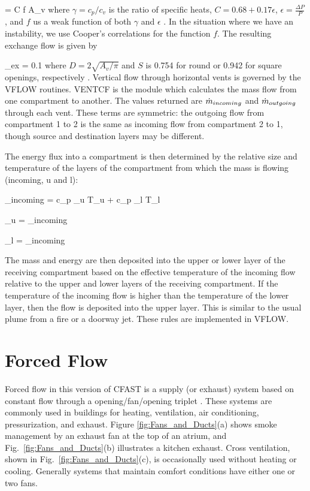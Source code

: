 \be \dm = C f\brackets{\gamma, \epsilon}  A_v \ee
where $\gamma = c_p/c_v$ is the ratio of specific heats, $C = 0.68 + 0.17 \epsilon$, $\epsilon = \frac{\Delta P}{P}$, and $f$ us a weak function of both $\gamma$ and $\epsilon$ \cite{Cooper:1989}. In the situation where we have an instability, we use Cooper's correlations for the function $f$.  The resulting exchange flow is given by

\be \dm_{ex} = 0.1   \ee
where $D = 2 \sqrt{A_v / \pi}$ and $S$ is 0.754 for round or 0.942 for square openings, respectively \cite{Cooper:1989}. Vertical flow through horizontal vents is governed by the VFLOW routines. VENTCF is the module which calculates the mass flow from one compartment to another. The values returned are $\dot{m}_{incoming}$ and $\dot{m}_{outgoing}$ through each vent. These terms are symmetric: the outgoing flow from compartment 1 to 2 is the same as incoming flow from compartment 2 to 1, though source and destination layers may be different.

The energy flux into a compartment is then determined by the relative size and temperature of the layers of the compartment from which the mass is flowing (incoming, u and l):

\be \dq_{incoming} = c_p \dm_u T_u + c_p \dm_l T_l \ee

\be \dm_u = \dm_{incoming}  \ee

\be \dm_l = \dm_{incoming}  \ee


The mass and energy are then deposited into the upper or lower layer of the receiving compartment based on the effective temperature of the incoming flow relative to the upper and lower layers of the receiving compartment. If the temperature of the incoming flow is higher than the temperature of the lower layer, then the flow is deposited into the upper layer. This is similar to the usual plume from a fire or a doorway jet. These rules are implemented in VFLOW.

\section{Forced Flow}

Forced flow in this version of CFAST is a supply (or exhaust) system based on constant flow through a opening/fan/opening triplet . These systems are commonly used in buildings for heating, ventilation, air conditioning, pressurization, and exhaust. Figure \ref{fig:Fans_and_Ducts}(a) shows smoke management by an exhaust fan at the top of an atrium, and Fig.~\ref{fig:Fans_and_Ducts}(b) illustrates a kitchen exhaust.  Cross ventilation, shown in Fig.~\ref{fig:Fans_and_Ducts}(c), is occasionally used without heating or cooling.  Generally systems that maintain comfort conditions have either one or two fans.

